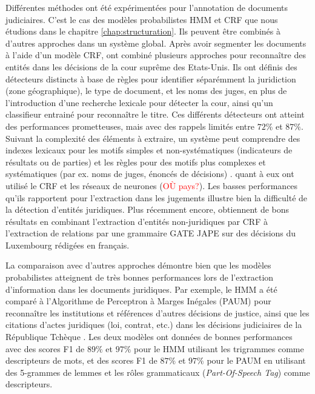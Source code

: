 Différentes méthodes ont été expérimentées pour l'annotation de documents judiciaires. C'est le cas des modèles probabilistes HMM et CRF que nous étudions dans le chapitre \ref{chap:structuration}. Ils peuvent être combinés à d'autres approches dans un système global. Après avoir segmenter les documents à l'aide d'un modèle CRF, \citet{dozier2010legalnerr} ont combiné plusieurs approches pour reconnaître des entités dans les décisions de la cour suprême des Etats-Unis. Ils ont définis des détecteurs distincts à base de règles pour identifier séparémment la juridiction (zone géographique), le type de document, et les noms des juges, en plus de l'introduction d'une recherche lexicale pour détecter la cour, ainsi qu'un classifieur entrainé pour reconnaître le titre. Ces différents détecteurs ont atteint des performances prometteuses, mais avec des rappels limités entre $ 72 \% $ et $ 87 \% $. Suivant la complexité des éléments à extraire, un système peut comprendre des indexes lexicaux pour les motifs simples et non-systématiques (indicateurs de résultats ou de parties) et les règles pour des motifs plus complexes et systématiques (par ex. noms de juges, énoncés de décisions) \citep{Waltl2016lexia, wyner2010extractlegalelts}. \cite{cardellino2017legalNERCL} quant à eux ont utilisé le CRF et les réseaux de neurones (\textcolor{red}{OÙ pays?}). Les basses performances qu'ils rapportent pour l'extraction dans les jugements illustre bien la difficulté de la détection d'entités juridiques. Plus récemment encore, \citet{andrew2018legalNerAndRelation} obtiennent de bons résultats en combinant l'extraction d'entités non-juridiques par CRF à l'extraction de relations par une grammaire GATE JAPE \citep{thakker2009gatejape} sur des décisions du Luxembourg rédigées en français.

La comparaison avec d'autres approches démontre bien que les modèles probabilistes atteignent de très bonnes performances lors de l'extraction d'information dans les documents juridiques. Par exemple, le HMM a été comparé à l'Algorithme de Perceptron à Marges Inégales (PAUM) \citep{li2002PAUM} pour reconnaître les institutions et références d'autres décisions de justice, ainsi que les citations d'actes juridiques (loi, contrat, etc.) dans les décisions judiciaires de la République Tchèque \citep{Kriz2014nerinczechdecisions}. Les deux modèles ont données de bonnes performances avec des scores F1 de $ 89 \% $ et $ 97 \% $ pour le HMM utilisant les trigrammes comme descripteurs de mots, et des scores F1 de $ 87 \% $ et $ 97 \% $ pour le PAUM en utilisant des 5-grammes de lemmes et les rôles grammaticaux (\textit{Part-Of-Speech Tag}) comme descripteurs. 

